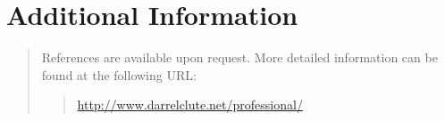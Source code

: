 \section*{Additional Information}
\begin{quote}
References are available upon request.  More detailed information can be found at the following URL:
\begin{quote}
\url{http://www.darrelclute.net/professional/}
\end{quote}
\end{quote}
